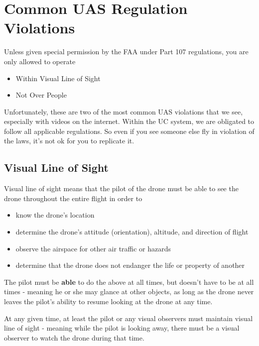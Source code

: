 \documentclass[
  12pt,
]{book}
\providecommand{\tightlist}{%
  \setlength{\itemsep}{0pt}\setlength{\parskip}{0pt}}
\begin{document}
\hypertarget{common-UAS-violations}{%
\section{Common UAS Regulation Violations}\label{common-UAS-violations}}

Unless given special permission by the FAA under Part 107 regulations, you are only allowed to operate

\begin{itemize}
\tightlist
\item
  Within Visual Line of Sight
\item
  Not Over People
\end{itemize}

Unfortunately, these are two of the most common UAS violations that we see, especially with videos on the internet. Within the UC system, we are obligated to follow all applicable regulations. So even if you see someone else fly in violation of the laws, it's not ok for you to replicate it.

\hypertarget{visual-line-of-sight}{%
\subsection{Visual Line of Sight}\label{visual-line-of-sight}}

Visual line of sight means that the pilot of the drone must be able to see the drone throughout the entire flight in order to

\begin{itemize}
\tightlist
\item
  know the drone's location
\item
  determine the drone's attitude (orientation), altitude, and direction of flight
\item
  observe the airspace for other air traffic or hazards
\item
  determine that the drone does not endanger the life or property of another
\end{itemize}

The pilot must be \textbf{able} to do the above at all times, but doesn't have to be at all times - meaning he or she may glance at other objects, as long as the drone never leaves the pilot's ability to resume looking at the drone at any time.

At any given time, at least the pilot or any visual observers must maintain visual line of sight - meaning while the pilot is looking away, there must be a visual observer to watch the drone during that time.
\end{document}
